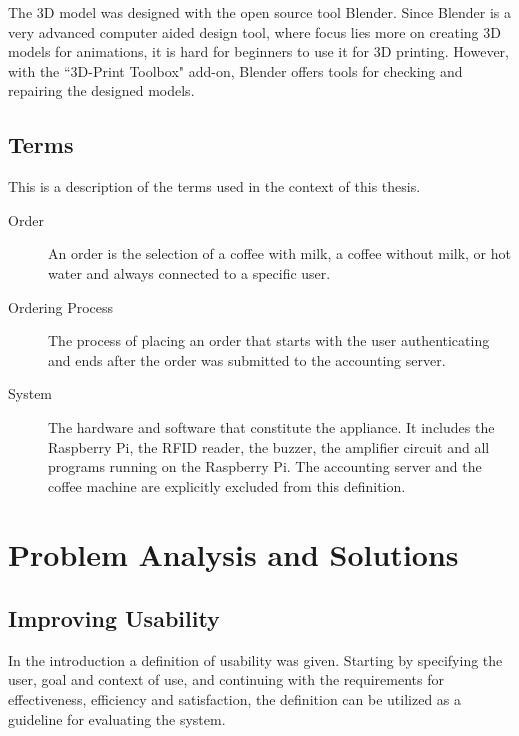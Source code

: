 \documentclass[12pt]{article}
\begin{document}
The 3D model was designed with the open source tool Blender.
Since Blender is a very advanced computer aided design tool,
where focus lies more on creating 3D models for animations,
it is hard for beginners to use it for 3D printing.
However, with the ``3D-Print Toolbox" add-on,
Blender offers tools for checking and repairing the designed models.

\subsection{Terms}
This is a description of the terms used in the context of this thesis.
\begin{description}
  \item [Order] An order is the selection of a coffee with milk, a coffee without milk, or hot water
        and always connected to a specific user.
  \item [Ordering Process] The process of placing an order that starts with
        the user authenticating and ends after the order was submitted to the accounting server.
  \item [System] The hardware and software that constitute the appliance.
    It includes the Raspberry Pi, the RFID reader, the buzzer, the amplifier circuit and all programs running on the Raspberry Pi.
    The accounting server and the coffee machine are explicitly excluded from this definition.
\end{description}

\section{Problem Analysis and Solutions}
\label{pa}

\subsection{Improving Usability}
\label{sec:usability}

In the introduction a definition of usability was given.
Starting by specifying the user, goal and context of use, and continuing with the requirements for effectiveness,
efficiency and satisfaction, the definition can be utilized as a guideline for evaluating the system.
\end{document}

